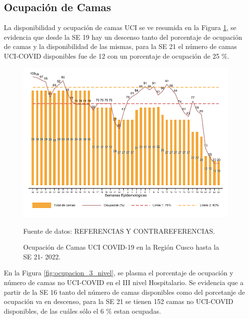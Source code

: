 \documentclass[12pt,a4paper,openany]{book}
\begin{document}
	
	
	\clearpage
	\subsection*{Ocupación de Camas}
	\noindent La disponibilidad y ocupación de camas UCI se ve resumida en la Figura \ref{fig:ocupacion_uci}, se evidencia que desde la SE 19 hay un descenso tanto del porcentaje de ocupación de camas y la disponibilidad de las mismas, para la SE 21 el número de camas UCI-COVID disponibles fue de 12 con un porcentaje de ocupación de 25 $\%$. 
	
	\begin{figure}[h]
		\caption{Ocupación de Camas UCI COVID-19 en la Región Cusco hasta la SE 21- 2022.}\label{fig:ocupacion_uci}
		\begin{center}
			\includegraphics[width=0.95\linewidth]{../figuras/uci.pdf}
		\end{center}
		{\footnotesize {Fuente de datos: REFERENCIAS Y CONTRAREFERENCIAS.}}
	\end{figure}
	\cleardoublepage
	
	En la Figura \ref{fig:ocupacion_3_nivel}, se plasma el porcentaje de ocupación y número de camas no UCI-COVID en el III nivel Hospitalario. Se evidencia que a partir de la SE 16 tanto del número de camas disponibles como del porcetanje de ocupación va en descenso, para la SE 21 se tienen 152 camas no UCI-COVID disponibles, de las cuáles sólo el 6 $\%$ estan ocupadas.
\end{document}
